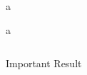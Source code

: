 \documentclass[final]{beamer}
\newlength{\onecolwid}
\newlength{\twocolwid}
\begin{document}
\begin{frame}[t]
\begin{columns}[t]
\begin{column}{\twocolwid}
\begin{alertblock}{a}

a

\end{alertblock}

\begin{columns}[t,totalwidth=\twocolwid] %

\begin{column}{\onecolwid}\vspace{-.6in} %




\end{column} %

\begin{column}{\onecolwid}\vspace{-.6in} %





\end{column} %

\end{columns} %




\begin{alertblock}{Important Result}



\end{alertblock}



\end{column}
\end{columns}
\end{frame}
\end{document}
